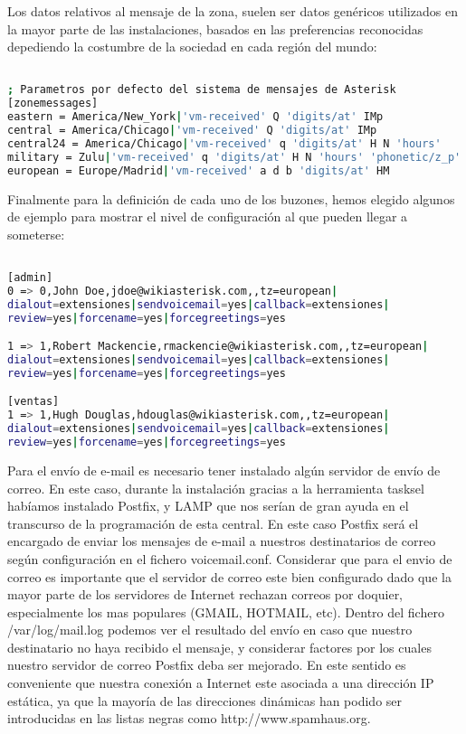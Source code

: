 Los datos relativos al mensaje de la zona, suelen ser datos genéricos utilizados en la mayor parte de las instalaciones, basados en las preferencias reconocidas depediendo la costumbre de la sociedad en cada región del mundo:

\begin{lstlisting}[language=bash,title={/etc/asterisk/voicemail.conf}]

; Parametros por defecto del sistema de mensajes de Asterisk
[zonemessages]
eastern = America/New_York|'vm-received' Q 'digits/at' IMp
central = America/Chicago|'vm-received' Q 'digits/at' IMp
central24 = America/Chicago|'vm-received' q 'digits/at' H N 'hours'
military = Zulu|'vm-received' q 'digits/at' H N 'hours' 'phonetic/z_p'
european = Europe/Madrid|'vm-received' a d b 'digits/at' HM

\end{lstlisting}

Finalmente para la definición de cada uno de los buzones, hemos elegido algunos de ejemplo para mostrar el nivel de configuración al que pueden llegar a someterse:

\begin{lstlisting}[language=bash,title={/etc/asterisk/voicemail.conf}]

[admin]
0 => 0,John Doe,jdoe@wikiasterisk.com,,tz=european|
dialout=extensiones|sendvoicemail=yes|callback=extensiones|
review=yes|forcename=yes|forcegreetings=yes

1 => 1,Robert Mackencie,rmackencie@wikiasterisk.com,,tz=european|
dialout=extensiones|sendvoicemail=yes|callback=extensiones|
review=yes|forcename=yes|forcegreetings=yes

[ventas]
1 => 1,Hugh Douglas,hdouglas@wikiasterisk.com,,tz=european|
dialout=extensiones|sendvoicemail=yes|callback=extensiones|
review=yes|forcename=yes|forcegreetings=yes

\end{lstlisting}

Para el envío de e-mail es necesario tener instalado algún servidor de envío de correo. En este caso, durante la instalación gracias a la herramienta tasksel habíamos instalado Postfix, y LAMP que nos serían de gran ayuda en el transcurso de la programación de esta central. En este caso Postfix será el encargado de enviar los mensajes de e-mail a nuestros destinatarios de correo según configuración en el fichero voicemail.conf. Considerar que para el envio de correo es importante que el servidor de correo este bien configurado dado que la mayor parte de los servidores de Internet rechazan correos por doquier, especialmente los mas populares (GMAIL, HOTMAIL, etc). Dentro del fichero /var/log/mail.log podemos ver el resultado del envío en caso que nuestro destinatario no haya recibido el mensaje, y considerar factores por los cuales nuestro servidor de correo Postfix deba ser mejorado. En este sentido es conveniente que nuestra conexión a Internet este asociada a una dirección IP estática, ya que la mayoría de las direcciones dinámicas han podido ser introducidas en las listas negras como http://www.spamhaus.org.


